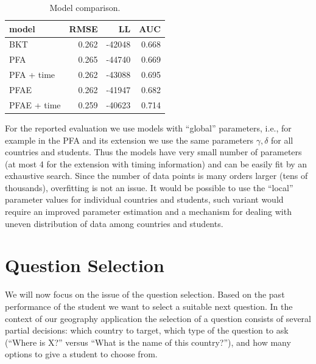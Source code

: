 \documentclass{edm_template}
\begin{document}

\begin{table}[t]
  \centering
  \caption{Model comparison. }
  \label{tab:model-comparison}

  \begin{tabular}{lrrr}
    \toprule
    model & RMSE & LL & AUC \\ \midrule
BKT & 0.262 & -42048 & 0.668 \\
PFA & 0.265 & -44740 & 0.669 \\
PFA + time & 0.262 & -43088 & 0.695 \\
PFAE & 0.262 & -41947 & 0.682 \\
PFAE + time & 0.259 & -40623 & 0.714 \\
    \bottomrule
  \end{tabular}
\end{table}



For the reported evaluation we use models with ``global'' parameters, i.e., for
example in the PFA and its extension we use the same parameters $\gamma,
\delta$ for all countries and students. Thus the models have very small number
of parameters (at most 4 for the extension with timing information) and can be
easily fit by an exhaustive search. Since the number of data points is many
orders larger (tens of thousands), overfitting is not an issue. It would be
possible to use the ``local'' parameter values for individual countries and
students, such variant would require an improved parameter estimation and a
mechanism for dealing with uneven distribution of data among countries and
students.




\section{Question Selection}

We will now focus on the issue of the question selection. Based on the past
performance of the student we want to select a suitable next question. In the
context of our geography application the selection of a question consists of
several partial decisions: which country to target, which type of the
question to ask (``Where is X?'' versus ``What is the name of this
country?''), and how many options to give a student to choose from.
\end{document}
